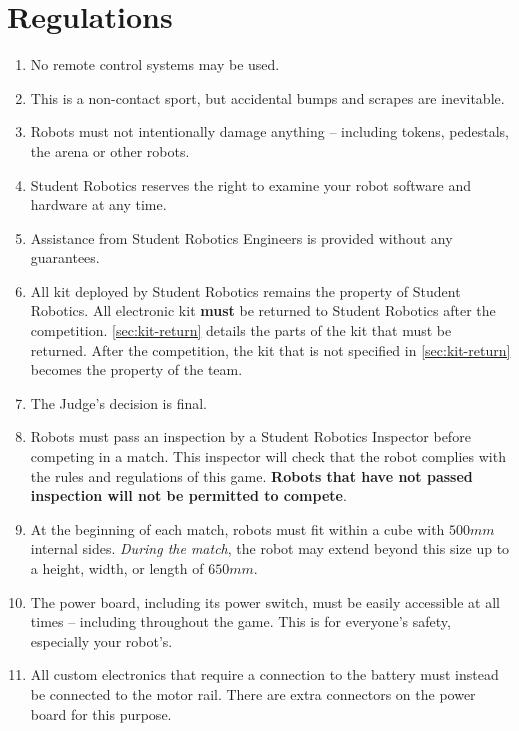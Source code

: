 \section {Regulations}
\label{sec:Regulations}

\begin{enumerate}


\item No remote control systems may be used.
\item This is a non-contact sport, but accidental bumps and scrapes are inevitable.
\item Robots must not intentionally damage anything -- including tokens, pedestals, the arena or other robots.
\item Student Robotics reserves the right to examine your robot software and hardware at any time.
\item Assistance from Student Robotics Engineers is provided without any guarantees.
\item All kit deployed by Student Robotics remains the property of Student Robotics.
      All electronic kit \textbf{must} be returned to Student Robotics after the competition.
      \autoref{sec:kit-return} details the parts of the kit that must be returned.
      After the competition, the kit that is not specified in \autoref{sec:kit-return} becomes the property of the team.

\item The Judge's decision is final.


\item Robots must pass an inspection by a Student Robotics Inspector before competing in a match.
      This inspector will check that the robot complies with the rules and regulations of this game.
      \textbf{Robots that have not passed inspection will not be permitted to compete}.

\item At the beginning of each match, robots must fit within a cube with $500mm$ internal sides.
      \textit{During the match}, the robot may extend beyond this size up to a height, width, or length of $650mm$.

\item The power board, including its power switch, must be easily accessible at all times -- including throughout the game.
      This is for everyone's safety, especially your robot's.

\item All custom electronics that require a connection to the battery must instead be connected to the motor rail.
      There are extra connectors on the power board for this purpose.


\end{enumerate}
